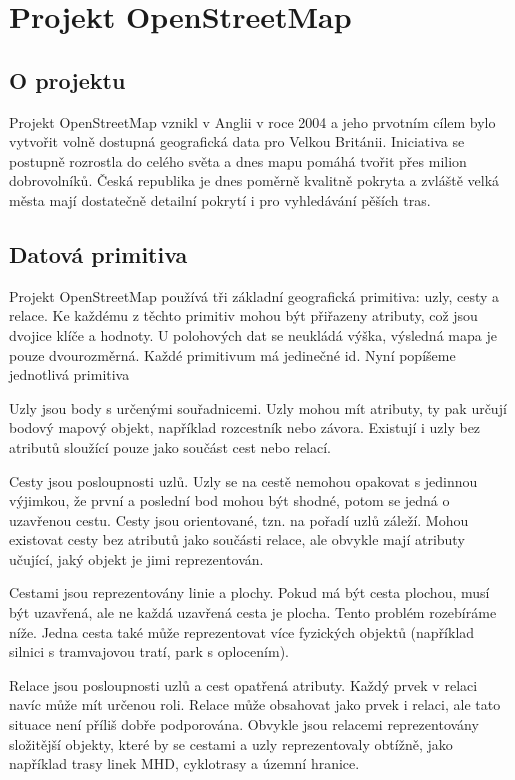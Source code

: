 \chapter{Projekt OpenStreetMap}
\section{O projektu}
Projekt OpenStreetMap\cite{osmweb} vznikl v Anglii v roce 2004 a jeho prvotním cílem bylo
vytvořit volně dostupná geografická data pro Velkou Británii. Iniciativa se
postupně rozrostla do celého světa a dnes mapu pomáhá tvořit přes milion
dobrovolníků. Česká republika je dnes poměrně kvalitně pokryta a zvláště velká
města mají dostatečně detailní pokrytí i pro vyhledávání pěších tras.

\section{Datová primitiva} 
Projekt OpenStreetMap používá tři základní geografická primitiva: uzly, cesty a
relace. Ke každému z těchto primitiv mohou být přiřazeny atributy, což jsou
dvojice klíče a hodnoty. 
U polohových dat se neukládá výška, výsledná mapa je pouze dvourozměrná.
Každé primitivum má jedinečné id.
Nyní popíšeme jednotlivá primitiva

{\tuc Uzly} jsou body s určenými souřadnicemi. Uzly mohou mít atributy, ty pak
určují bodový mapový objekt, například rozcestník nebo závora. Existují i uzly
bez atributů sloužící pouze jako součást cest nebo relací.

{\tuc Cesty} jsou posloupnosti uzlů. Uzly se na cestě nemohou opakovat s
jedinnou výjimkou, že první a poslední bod mohou být shodné, potom se jedná o
uzavřenou cestu. Cesty jsou orientované, tzn. na pořadí uzlů záleží. Mohou
existovat cesty bez atributů jako součásti relace, ale obvykle mají atributy
učující, jaký objekt je jimi reprezentován.

Cestami jsou reprezentovány linie a plochy. Pokud má být cesta plochou, musí být
uzavřená, ale ne každá uzavřená cesta je plocha. Tento problém rozebíráme níže.
Jedna cesta také může reprezentovat více fyzických objektů (například silnici s
tramvajovou tratí, park s oplocením).

{\tuc Relace} jsou posloupnosti uzlů a cest opatřená atributy. Každý prvek v
relaci navíc může mít určenou roli. Relace může obsahovat jako prvek i relaci,
ale tato situace není příliš dobře podporována.  Obvykle jsou relacemi
reprezentovány složitější objekty, které by se cestami a uzly reprezentovaly
obtížně, jako například trasy linek MHD, cyklotrasy a územní hranice.

